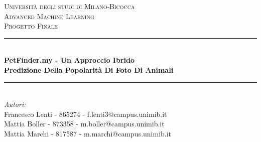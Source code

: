 \begin{titlepage}

\newcommand{\HRule}{\rule{\linewidth}{0.5mm}} %

\center %
 

\textsc{\LARGE Università degli studi di Milano-Bicocca}\\[1cm] %
\textsc{\Large Advanced Machine Learning }\\[0.3cm] %
\textsc{\large Progetto Finale}\\[0.1cm] %


\HRule \\[0.4cm]
{ \huge \bfseries PetFinder.my - Un Approccio Ibrido}\\[0.4cm] %
{ \large \textbf{Predizione Della Popolarità Di Foto Di Animali}}
\HRule \\[1.5cm]
 

\large
\emph{Autori:}\\
Francesco Lenti - 865274 - f.lenti3@campus.unimib.it \\   %
Mattia Boller - 873358 - m.boller@campus.unimib.it   \\
Mattia Marchi - 817587 - m.marchi@campus.unimib.it   \\[1cm] %




\end{titlepage}
